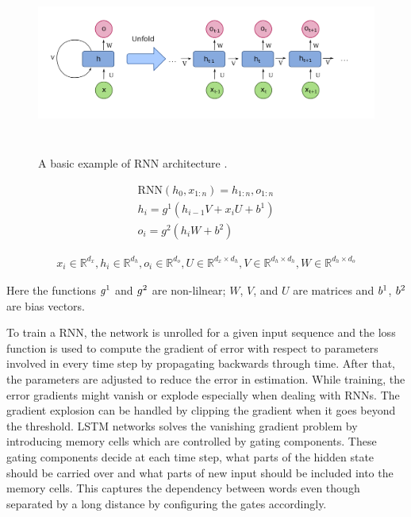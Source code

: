 \documentclass[a4paper, 11pt]{article}
\newcommand{\R}{\mathbb{R}}
\begin{document}

\begin{figure}[htpb!]
    \centering
    \includegraphics[width=\textwidth,height=6cm,keepaspectratio=true]
    {Recurrent_neural_network_unfold.png}
    \caption{
        A basic example of RNN architecture \cite{WikipediaEN_RNN_unfold}.
    }
    \label{fig:A basic RNN architecture}
\end{figure}

\begin{align*}
\mathrm{RNN}(h_0,x_{1:n}) = h_{1:n}, o_{1:n} \\
h_i = g^1(h_{i-1}V + x_iU + b^1) \\
o_i = g^2(h_iW + b^2) 
\end{align*}

\begin{align*}
x_i \in \R^{d_x}, h_i \in \R^{d_h}, o_i \in \R^{d_o}, U \in \R^{d_x \times d_h}, V \in \R^{d_h \times d_h}, W \in \R^{d_h \times d_o}
\end{align*}

Here the functions $g\textsuperscript{1}$ and $g\textsuperscript{2}$ are non-lilnear; $W$, $V$, and $U$ are matrices and $b\textsuperscript{1}$, $b\textsuperscript{2}$ are bias vectors. 

To train a RNN, the network is unrolled for a given input sequence and the loss function is used to compute the gradient of error with respect to parameters involved in every time step by propagating backwards through time. After that, the parameters are adjusted to reduce the error in estimation\cite{Werbos1990}. While training, the error gradients might vanish or explode especially when dealing with RNNs. The gradient explosion can be handled by clipping the gradient when it goes beyond the threshold. LSTM networks \cite{Hochreiter1997} solves the vanishing gradient problem by introducing memory cells which are controlled by gating components. These gating components decide at each time step, what parts of the hidden state should be carried over and what parts of new input should be included into the memory cells. This captures the dependency between words even though separated by a long distance by configuring the gates accordingly.
\end{document}
